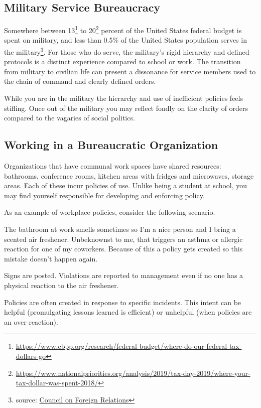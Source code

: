 \subsection*{Military Service Bureaucracy\label{bureaucracy-of-military}}
Somewhere between 13\footnote{\href{https://www.cbpp.org/research/federal-budget/where-do-our-federal-tax-dollars-go}{https://www.cbpp.org/research/federal-budget/where-do-our-federal-tax-dollars-go}} to 20\footnote{\href{https://www.nationalpriorities.org/analysis/2019/tax-day-2019/where-your-tax-dollar-was-spent-2018/}{https://www.nationalpriorities.org/analysis/2019/tax-day-2019/where-your-tax-dollar-was-spent-2018/}} percent of the United States federal budget is spent on military, and 
less than 0.5\% of the United States population serves in the military\footnote{source: \href{https://www.cfr.org/backgrounder/demographics-us-military}{Council on Foreign Relations}}. For those who do serve, the military's rigid hierarchy and defined protocols is a distinct experience compared to school or work. The transition from military to civilian life can present a dissonance for service members used to the chain of command and clearly defined orders. 

While you are in the military the hierarchy and use of inefficient policies feels stifling. Once out of the military you may reflect fondly on the clarity of orders compared to the vagaries of social politics.  

\subsection*{Working in a Bureaucratic Organization\label{sec:bureaucracy-of-work}}



Organizations that have communal work spaces have \glspl{shared resource}: bathrooms, conference rooms, kitchen areas with fridges and microwaves, storage areas. Each of these incur policies of use. Unlike being a student at school, you may find yourself responsible for developing and enforcing policy. 

As an example of workplace policies, consider the following scenario. 
\begin{mdframed}
The bathroom at work smells sometimes so I'm a nice person and I bring a scented air freshener. Unbeknownst to me, that triggers an asthma or allergic reaction for one of my coworkers. Because of this a policy gets created so this mistake doesn't happen again. 

Signs are posted. Violations are reported to management even if no one has a physical reaction to the air freshener.
\end{mdframed}
Policies are often created in response to specific incidents. This intent can be helpful (promulgating lessons learned is efficient) or unhelpful (when policies are an over-reaction). 

